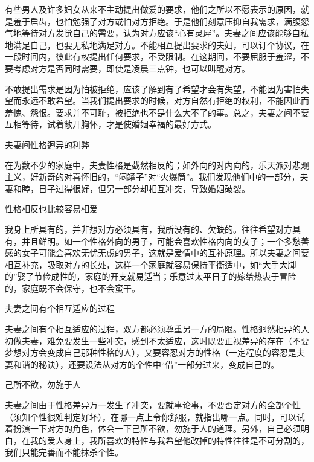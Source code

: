 \documentclass[12pt,UTF8]{ctexbook}
\begin{document}
有些男人及许多妇女从来不主动提出做爱的要求，他们之所以不愿表示的原因，就是羞于启齿，也怕勉强了对方或怕对方拒绝。于是他们刻意压抑自我需求，满腹怨气地等待对方发觉自己的需要，认为对方应该“心有灵犀”。夫妻之间应该能够自私地满足自己，也要无私地满足对方。不能相互提出要求的夫妇，可以订个协议，在一段时间内，彼此有权提出任何要求，不受限制。在这期间，不要屈服于羞涩，不要考虑对方是否同时需要，即使是凌晨三点钟，也可以叫醒对方。

不敢提出需求是因为怕被拒绝，应该了解到有了希望才会有失望，不能因为害怕失望而永远不敢希望。当我们提出要求的时候，对方自然有拒绝的权利，不能因此而羞愧、怨恨。要求并不可耻，被拒绝也不是什么大不了的事。总之，夫妻之间不要互相等待，试着敞开胸怀，才是使婚姻幸福的最好方式。





夫妻间性格迥异的利弊


在为数不少的家庭中，夫妻性格是截然相反的；如外向的对内向的，乐天派对悲观主义，好新奇的对喜怀旧的，“闷罐子”对“火爆筒”。我们发现他们中的一部分，夫妻和睦，日子过得很好，但另一部分却相互冲突，导致婚姻破裂。





性格相反也比较容易相爱


我身上所具有的，并非想对方必须具有，我所没有的、欠缺的。往往希望对方具有，并且鲜明。如一个性格外向的男子，可能会喜欢性格内向的女子；一个多愁善感的女子可能会喜欢无忧无虑的男子，这就是爱情中的互补原理。所以夫妻之间要相互补充，吸取对方的长处，这样一个家庭就容易保持平衡适中，如“大手大脚的”娶了节俭成性的，家庭的开支就易适当；乐意过太平日子的嫁给热衷于冒险的，家庭既不会保守，也不会蛮干。





夫妻之间有个相互适应的过程


夫妻之间有个相互适应的过程，双方都必须尊重另一方的局限。性格迥然相异的人初做夫妻，难免要发生一些冲突，感到不太适应，这时既要正视差异的存在（不要梦想对方会变成自己那种性格的人），又要容忍对方的性格（一定程度的容忍是夫妻和谐的秘诀），还要设法从对方的个性中“借”一部分过来，变成自己的。





己所不欲，勿施于人


夫妻之间由于性格差异万一发生了冲突，要就事论事，不要否定对方的全部个性（须知个性很难判定好坏），在哪一点上令你舒服，就指出哪一点。同时，可以试着扮演一下对方的角色，体会一下己所不欲，勿施于人的道理。另外，自己必须明白，在我的爱人身上，我所喜欢的特性与我希望他改掉的特性往往是不可分割的，我们只能完善而不能抹杀个性。
\end{document}
